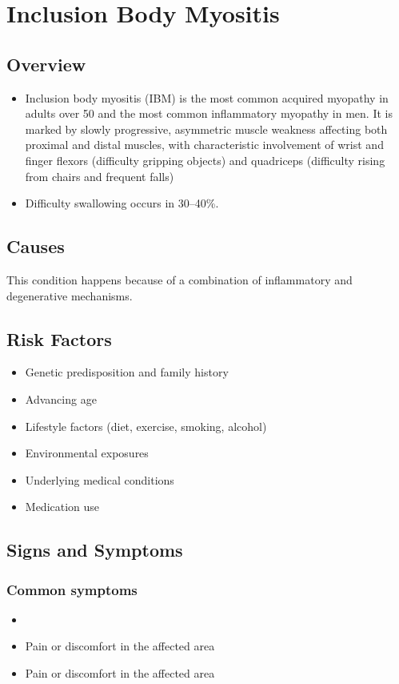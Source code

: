 \chapter{Inclusion Body Myositis}
\label{sec:Inclusion Body Myositis}

\section{Overview}


\begin{itemize}[noitemsep]
  \item Inclusion body myositis (IBM) is the most common acquired myopathy in adults over 50 and the most common inflammatory myopathy in men. It is marked by slowly progressive, asymmetric muscle weakness affecting both proximal and distal muscles, with characteristic involvement of wrist and finger flexors (difficulty gripping objects) and quadriceps (difficulty rising from chairs and frequent falls)
  \item Difficulty swallowing occurs in 30--40\%.
\end{itemize}
\section{Causes}
This condition happens because of a combination of inflammatory and degenerative mechanisms.     
\section{Risk Factors}

\begin{itemize}[noitemsep]
  \item Genetic predisposition and family history
  \item Advancing age
  \item Lifestyle factors (diet, exercise, smoking, alcohol)
  \item Environmental exposures
  \item Underlying medical conditions
  \item Medication use
\end{itemize}
\section{Signs and Symptoms}

\subsection{Common symptoms}
\begin{itemize}[noitemsep]
  \item \item Pain or discomfort in the affected area    \item Pain or discomfort in the affected area
  \end{itemize}

